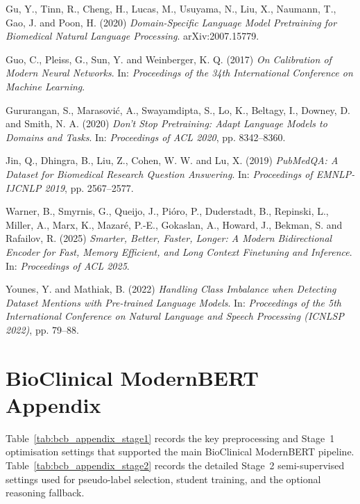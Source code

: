 \documentclass{article}
\begin{document}
\begin{thebibliography}{}

Gu, Y., Tinn, R., Cheng, H., Lucas, M., Usuyama, N., Liu, X., Naumann, T., Gao, J. and Poon, H. (2020) \textit{Domain-Specific Language Model Pretraining for Biomedical Natural Language Processing}. arXiv:2007.15779.

Guo, C., Pleiss, G., Sun, Y. and Weinberger, K. Q. (2017) \textit{On Calibration of Modern Neural Networks}. In: \textit{Proceedings of the 34th International Conference on Machine Learning}.

Gururangan, S., Marasovi\'c, A., Swayamdipta, S., Lo, K., Beltagy, I., Downey, D. and Smith, N. A. (2020) \textit{Don't Stop Pretraining: Adapt Language Models to Domains and Tasks}. In: \textit{Proceedings of ACL 2020}, pp. 8342--8360.

Jin, Q., Dhingra, B., Liu, Z., Cohen, W. W. and Lu, X. (2019) \textit{PubMedQA: A Dataset for Biomedical Research Question Answering}. In: \textit{Proceedings of EMNLP-IJCNLP 2019}, pp. 2567--2577.

Warner, B., Smyrnis, G., Queijo, J., Pi\'oro, P., Duderstadt, B., Repinski, L., Miller, A., Marx, K., Mazar\'e, P.-E., Gokaslan, A., Howard, J., Bekman, S. and Rafailov, R. (2025) \textit{Smarter, Better, Faster, Longer: A Modern Bidirectional Encoder for Fast, Memory Efficient, and Long Context Finetuning and Inference}. In: \textit{Proceedings of ACL 2025}.

Younes, Y. and Mathiak, B. (2022) \textit{Handling Class Imbalance when Detecting Dataset Mentions with Pre-trained Language Models}. In: \textit{Proceedings of the 5th International Conference on Natural Language and Speech Processing (ICNLSP 2022)}, pp. 79--88.


\end{thebibliography}

\appendix
\section{BioClinical ModernBERT Appendix}
\label{app:bcb_supporting_tables}

Table~\ref{tab:bcb_appendix_stage1} records the key preprocessing and Stage~1 optimisation settings that supported the main BioClinical ModernBERT pipeline. Table~\ref{tab:bcb_appendix_stage2} records the detailed Stage~2 semi-supervised settings used for pseudo-label selection, student training, and the optional reasoning fallback.
\end{document}
